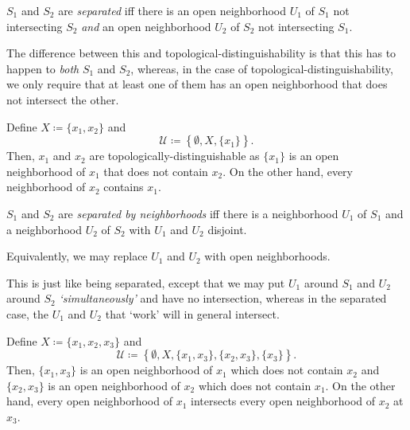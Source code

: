 \begin{dfn}[Separated]\label{Separated}
$S_1$ and $S_2$ are \emph{separated} iff there is an open neighborhood $U_1$ of $S_1$ not intersecting $S_2$ \emph{and} an open neighborhood $U_2$ of $S_2$ not intersecting $S_1$.
\begin{rmk}
The difference between this and topological-distinguishability is that this has to happen to \emph{both} $S_1$ and $S_2$, whereas, in the case of topological-distinguishability, we only require that at least one of them has an open neighborhood that does not intersect the other.
\end{rmk}
\end{dfn}
\begin{exm}\label{exm4.5.3}
Define $X\coloneqq \{ x_1,x_2\}$ and
\begin{equation}
\mathcal{U}\coloneqq \left\{ \emptyset ,X,\{ x_1\} \right\} .
\end{equation}
Then, $x_1$ and $x_2$ are topologically-distinguishable as $\{ x_1\}$ is an open neighborhood of $x_1$ that does not contain $x_2$.  On the other hand, every neighborhood of $x_2$ contains $x_1$.
\end{exm}
\begin{dfn}\label{SeparatedByNeighborhoods}
$S_1$ and $S_2$ are \emph{separated by neighborhoods} iff there is a neighborhood $U_1$ of $S_1$ and a neighborhood $U_2$ of $S_2$ with $U_1$ and $U_2$ disjoint.
\begin{rmk}
Equivalently, we may replace $U_1$ and $U_2$ with open neighborhoods.
\end{rmk}
\begin{rmk}
This is just like being separated, except that we may put $U_1$ around $S_1$ and $U_2$ around $S_2$ \emph{`simultaneously'} and have no intersection, whereas in the separated case, the $U_1$ and $U_2$ that `work' will in general intersect.
\end{rmk}
\end{dfn}
\begin{exm}\label{exm4.5.8}
Define $X\coloneqq \{ x_1,x_2,x_3\}$ and
\begin{equation}
\mathcal{U}\coloneqq \left\{ \emptyset ,X,\{ x_1,x_3\} ,\{ x_2,x_3\} ,\{ x_3\} \right\} .
\end{equation}
Then, $\{ x_1,x_3\}$ is an open neighborhood of $x_1$ which does not contain $x_2$ and $\{ x_2,x_3\}$ is an open neighborhood of $x_2$ which does not contain $x_1$.  On the other hand, every open neighborhood of $x_1$ intersects every open neighborhood of $x_2$ at $x_3$.
\end{exm}
